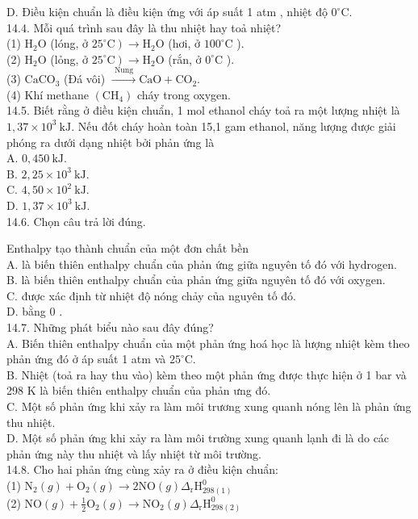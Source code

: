 \documentclass[10pt]{article}
\begin{document}
\begin{enumerate}
D. Điều kiện chuẩn là điều kiện ứng với áp suất 1 atm , nhiệt độ $0^{\circ} \mathrm{C}$.\\
14.4. Mỗi quá trình sau đây là thu nhiệt hay toả nhiệt?\\
(1) $\mathrm{H}_{2} \mathrm{O}$ (lóng, ở $\left.25^{\circ} \mathrm{C}\right) \rightarrow \mathrm{H}_{2} \mathrm{O}$ (hơi, ở $100^{\circ} \mathrm{C}$ ).\\
(2) $\mathrm{H}_{2} \mathrm{O}$ (lỏng, ở $\left.25^{\circ} \mathrm{C}\right) \rightarrow \mathrm{H}_{2} \mathrm{O}$ (rắn, ở $0^{\circ} \mathrm{C}$ ).\\
(3) $\mathrm{CaCO}_{3}$ (Đá vôi) $\xrightarrow{\text { Nung }} \mathrm{CaO}+\mathrm{CO}_{2}$.\\
(4) Khí methane $\left(\mathrm{CH}_{4}\right)$ cháy trong oxygen.\\
14.5. Biết rằng ở điều kiện chuẩn, 1 mol ethanol cháy toả ra một lượng nhiệt là $1,37 \times 10^{3} \mathrm{~kJ}$. Nếu đốt cháy hoàn toàn 15,1 gam ethanol, năng lượng được giải phóng ra dưới dạng nhiệt bởi phản ứng là\\
A. $0,450 \mathrm{~kJ}$.\\
B. $2,25 \times 10^{3} \mathrm{~kJ}$.\\
C. $4,50 \times 10^{2} \mathrm{~kJ}$.\\
D. $1,37 \times 10^{3} \mathrm{~kJ}$.\\
14.6. Chọn câu trả lời đúng.
\end{enumerate}

Enthalpy tạo thành chuẩn của một đơn chất bền\\
A. là biến thiên enthalpy chuẩn của phản ứng giữa nguyên tố đó với hydrogen.\\
B. là biến thiên enthalpy chuẩn của phản ứng giữa nguyên tố đó với oxygen.\\
C. được xác định từ nhiệt độ nóng chảy của nguyên tố đó.\\
D. bằng 0 .\\
14.7. Những phát biểu nào sau đây đúng?\\
A. Biến thiên enthalpy chuẩn của một phản ứng hoá học là lượng nhiệt kèm theo phản ứng đó ở áp suất 1 atm và $25^{\circ} \mathrm{C}$.\\
B. Nhiệt (toả ra hay thu vào) kèm theo một phản ứng được thực hiện ở 1 bar và 298 K là biến thiên enthalpy chuẩn của phản ưng đó.\\
C. Một số phản ứng khi xảy ra làm môi trương xung quanh nóng lên là phản ứng thu nhiệt.\\
D. Một số phản ứng khi xảy ra làm môi trường xung quanh lạnh đi là do các phản ứng này thu nhiệt và lấy nhiệt từ môi trường.\\
14.8. Cho hai phản ứng cùng xảy ra ở điều kiện chuẩn:\\
(1) $\mathrm{N}_{2}(g)+\mathrm{O}_{2}(g) \rightarrow 2 \mathrm{NO}(g) \Delta_{\mathrm{r}} \mathrm{H}_{298(1)}^{0}$\\
(2) $\mathrm{NO}(g)+\frac{1}{2} \mathrm{O}_{2}(g) \rightarrow \mathrm{NO}_{2}(g) \Delta_{\mathrm{r}} \mathrm{H}_{298(2)}^{0}$
\end{document}
